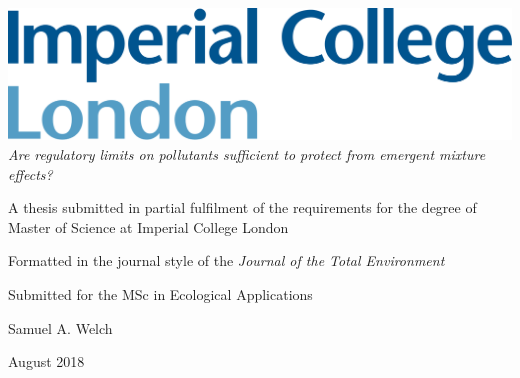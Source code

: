 \documentclass[final,1p,times]{elsarticle}
\begin{document}
\begin{titlepage}
\includegraphics[scale = 0.1]{icl_logo.png}\\

\centering
\textit{Are regulatory limits on pollutants sufficient to protect from emergent mixture effects?}

A thesis submitted in partial fulfilment of the requirements for the degree of Master of Science at Imperial College London

Formatted in the journal style of the \textit{Journal of the Total Environment}

Submitted for the MSc in Ecological Applications

Samuel A. Welch

August 2018
\end{titlepage}
\end{document}
